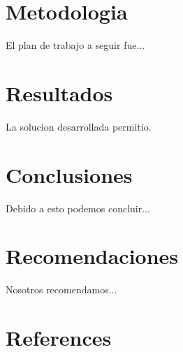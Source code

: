 \documentclass{amsart}
\begin{document}
    
        
            
       

    \section{Metodologia}
        El plan de trabajo a seguir fue...
        
        


    
    \section{Resultados}
    La solucion desarrollada permitio.

    \section{Conclusiones}
    Debido a esto podemos concluir...
    
    
    \section{Recomendaciones}
    Nosotros recomendamos...


    \section{References}
    \printbibliography[title={References}, heading=none]

    
 
\end{document}
